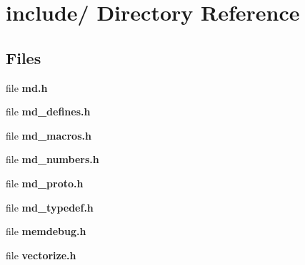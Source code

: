 \section{include/ Directory Reference}
\label{dir_bc6d0323bcd36a33f1cdc8fc437309ad}
\subsection*{Files}
\begin{CompactItemize}
\item 
file {\bf md.h}
\item 
file {\bf md\_\-defines.h}
\item 
file {\bf md\_\-macros.h}
\item 
file {\bf md\_\-numbers.h}
\item 
file {\bf md\_\-proto.h}
\item 
file {\bf md\_\-typedef.h}
\item 
file {\bf memdebug.h}
\item 
file {\bf vectorize.h}
\end{CompactItemize}
